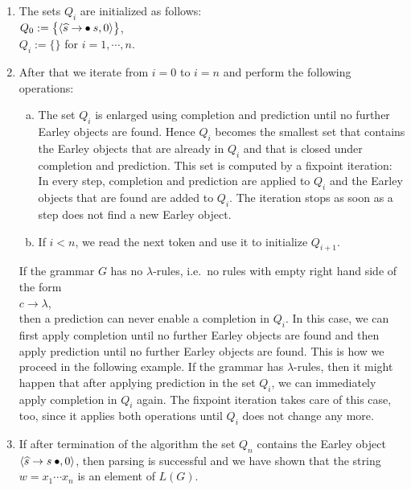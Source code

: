 \begin{enumerate}
\item The sets  $Q_i$ are initialized as follows:
      \\[0.2cm]
      \hspace*{1.3cm}
      $Q_0 := \bigl\{ \pair(\widehat{s} \rightarrow \mdot s, 0) \bigr\}$,
      \\[0.2cm]
      \hspace*{1.3cm}
      $Q_i := \bigl\{ \bigr\}$ \quad for $i=1,\cdots,n$.
\item After that we iterate from $i=0$ to $i=n$ and perform the following operations:
      \begin{enumerate}[(a)]
      \item The set $Q_i$ is enlarged using completion and prediction until no further Earley objects are found.
            Hence $Q_i$ becomes the smallest set that contains the Earley objects that are already in $Q_i$ and
            that is closed under completion and prediction.  This set is computed by a fixpoint iteration:  In
            every step, completion and prediction are applied to $Q_i$ and the Earley objects that are found are
            added to $Q_i$.  The iteration stops as soon as a step does not find a new Earley object.
      \item If $i < n$, we read the next token and use it to initialize $Q_{i+1}$.
      \end{enumerate}
      If the grammar $G$ has no $\lambda$-rules, i.e.~no rules with empty right hand side of the form
      \\[0.2cm]
      \hspace*{1.3cm}
      $c \rightarrow \lambda$,
      \\[0.2cm]
      then a prediction can never enable a completion in $Q_i$.  In this case, we can first apply completion until
      no further Earley objects are found and then apply prediction until no further Earley objects are found.  This
      is how we proceed in the following example.  If the grammar has $\lambda$-rules, then it might happen that
      after applying prediction in the set $Q_i$, we can immediately apply completion in $Q_i$ again.  The fixpoint
      iteration takes care of this case, too, since it applies both operations until $Q_i$ does not change any
      more.
\item If after termination of the algorithm the set  $Q_n$ contains the Earley object
      $\pair(\widehat{s} \rightarrow s \mdot,0)$, then parsing is successful and we have shown that
      the string $w = x_1 \cdots x_n$ is an element of $L(G)$.
\end{enumerate}
  
